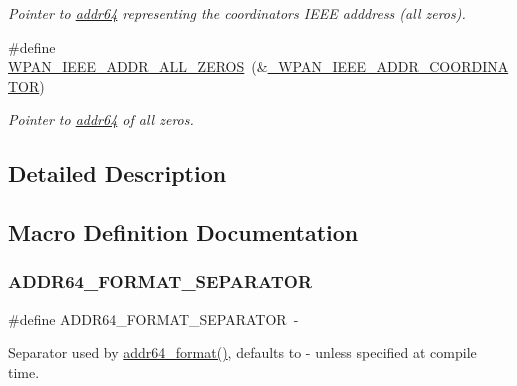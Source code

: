 \begin{DoxyCompactItemize}
\begin{DoxyCompactList}\small\item\em Pointer to {\ttfamily \hyperlink{unionaddr64}{addr64}} representing the coordinator\textquotesingle{}s I\+E\+EE adddress (all zeros). \end{DoxyCompactList}\item 
\#define \hyperlink{group__wpan__types_ga014f9d0857312b6a7f80ee10ecfd0935}{W\+P\+A\+N\+\_\+\+I\+E\+E\+E\+\_\+\+A\+D\+D\+R\+\_\+\+A\+L\+L\+\_\+\+Z\+E\+R\+OS}~(\&\hyperlink{group__wpan__types_gac6bb0830c58428d2789507a23ab9fcdd}{\+\_\+\+W\+P\+A\+N\+\_\+\+I\+E\+E\+E\+\_\+\+A\+D\+D\+R\+\_\+\+C\+O\+O\+R\+D\+I\+N\+A\+T\+OR})
\begin{DoxyCompactList}\small\item\em Pointer to {\ttfamily \hyperlink{unionaddr64}{addr64}} of all zeros. \end{DoxyCompactList}\end{DoxyCompactItemize}


\subsection{Detailed Description}


\subsection{Macro Definition Documentation}
\mbox{\label{group__wpan__types_ga806a2554dd5d8a154d23b13b9cf72141}} 
\subsubsection{\texorpdfstring{A\+D\+D\+R64\+\_\+\+F\+O\+R\+M\+A\+T\+\_\+\+S\+E\+P\+A\+R\+A\+T\+OR}{ADDR64\_FORMAT\_SEPARATOR}}
{\footnotesize\ttfamily \#define A\+D\+D\+R64\+\_\+\+F\+O\+R\+M\+A\+T\+\_\+\+S\+E\+P\+A\+R\+A\+T\+OR~\textquotesingle{}-\/\textquotesingle{}}



Separator used by \hyperlink{group__wpan__types_ga448782f4aed0821758969b47221417ed}{addr64\+\_\+format()}, defaults to \textquotesingle{}-\/\textquotesingle{} unless specified at compile time. 



